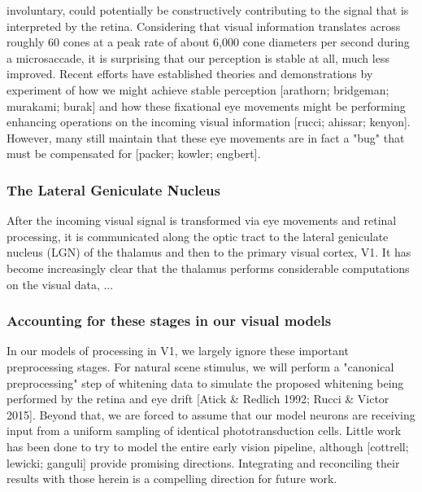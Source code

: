 involuntary, could potentially be constructively contributing to the signal that is interpreted by the retina. Considering that visual information translates across roughly 60 cones at a peak rate of about 6,000 cone diameters per second during a microsaccade, it is surprising that our perception is stable at all, much less improved. Recent efforts have established theories and demonstrations by experiment of how we might achieve stable perception [arathorn; bridgeman; murakami; burak] and how these fixational eye movements might be performing enhancing operations on the incoming visual information [rucci; ahissar; kenyon]. However, many still maintain that these eye movements are in fact a "bug" that must be compensated for [packer; kowler; engbert].

\subsubsection{The Lateral Geniculate Nucleus} After the incoming visual signal is transformed via eye movements and retinal processing, it is communicated along the optic tract to the lateral geniculate nucleus (LGN) of the thalamus and then to the primary visual cortex, V1. It has become increasingly clear that the thalamus performs considerable computations on the visual data, ...

\subsubsection{Accounting for these stages in our visual models} In our models of processing in V1, we largely ignore these important preprocessing stages. For natural scene stimulus, we will perform a "canonical preprocessing" step of whitening data to simulate the proposed whitening being performed by the retina and eye drift [Atick & Redlich 1992; Rucci & Victor 2015]. Beyond that, we are forced to assume that our model neurons are receiving input from a uniform sampling of identical phototransduction cells. Little work has been done to try to model the entire early vision pipeline, although [cottrell; lewicki; ganguli] provide promising directions. Integrating and reconciling their results with those herein is a compelling direction for future work.

